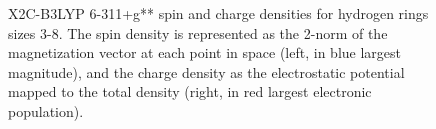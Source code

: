 \begin{figure}
\begin{center}
\end{center}
\caption{X2C-B3LYP  6-311+g** spin and charge densities for hydrogen rings sizes 3-8. The spin density is represented as the 2-norm of the magnetization vector at each point in space (left, in blue largest magnitude), and the charge density as the electrostatic potential mapped to the total density (right, in red largest electronic population).}
\label{fig:rings}       
\end{figure}


